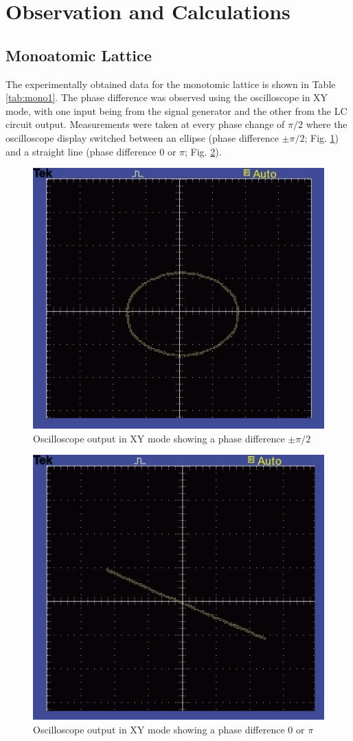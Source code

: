 \section{Observation and Calculations}
\subsection{Monoatomic Lattice}
The experimentally obtained data for the monotomic
lattice is shown in Table \ref{tab:mono1}. The phase difference was observed using the oscilloscope in XY mode, with one input being from the signal generator and the other from the LC circuit output. Measurements were taken at every phase change of $\pi/2$ where the oscilloscope display switched between an ellipse (phase difference $\pm \pi/2$; Fig. \ref{tk1}) and a straight line (phase difference 0 or $\pi$; Fig. \ref{tk2}).

\begin{figure}[H]
    \centering
    \includegraphics[width=.8\columnwidth]{images/TEK0000.JPG}
    \caption{Oscilloscope output in XY mode showing a phase difference $\pm \pi/2$}
    \label{tk1}
\end{figure}

\begin{figure}[H]
    \centering
    \includegraphics[width=.8\columnwidth]{images/TEK0001.JPG}
    \caption{Oscilloscope output in XY mode showing a phase difference 0 or $\pi$}
    \label{tk2}
\end{figure}

